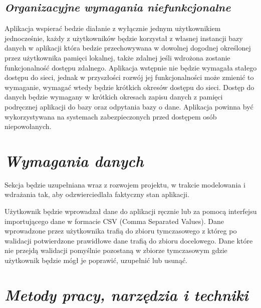 \documentclass[a4paper,10pt]{report}
\newcommand{\customstylechapter}[1]{\large{\textit{#1}}}
\newcommand{\customstylesection}[1]{\textbf{\textit{#1}}}
\begin{document}
\section{\customstylesection{Organizacyjne wymagania niefunkcjonalne}}
{Aplikacja wspierać bedzie diałanie z wyłącznie jednym użytkownikiem 
jednocześnie, każdy z użytkowników będzie korzystał z własnej instancji bazy 
danych w aplikacji która bedzie przechowywana w dowolnej dogodnej określonej 
przez użytkownika pamięci lokalnej, także zdalnej jeśli wdrożona zostanie 
funkcjonalność dostępu zdalnego. Aplikacja wstępnie nie będzie wymagała stałego 
dostępu do sieci, jednak w przyszłości rozwój jej funkcjonalności może zmienić 
to wymaganie, wymagać wtedy będzie krótkich okresów dostępu do sieci. Dostęp do 
danych będzie wymagany w krótkich okresach zapisu danych z pamięci podręcznej 
aplikacji do bazy oraz odpytania bazy o dane. Aplikacja powinna być 
wykorzystywana na systemach zabezpieczonych przed dostępem osób niepowołanych.}

\chapter{\customstylechapter{Wymagania danych}}
{Sekcja będzie uzupełniana wraz z rozwojem projektu, w trakcie modelowania i 
wdrażania tak, aby odzwierciedlała faktyczny stan aplikacji.}

{Użytkownik będzie wprowadzał dane do aplikacji ręcznie lub za pomocą interfejsu
importującego dane w formacie CSV (Comma Separated Values). Dane wprowadzone 
przez użytkownika trafią do zbioru tymczasowego z któreg po walidacji 
potwierdzone prawidłowe dane trafią do zbioru docelowego. Dane które nie przejdą
 walidacji pomyślnie pozostaną w zbiorze tymczasowym gdzie użytkownik będzie 
mógł je poprawić, uzupełnić lub usunąć.}

\chapter{\customstylechapter{Metody pracy, narzędzia i techniki}}
\end{document}
